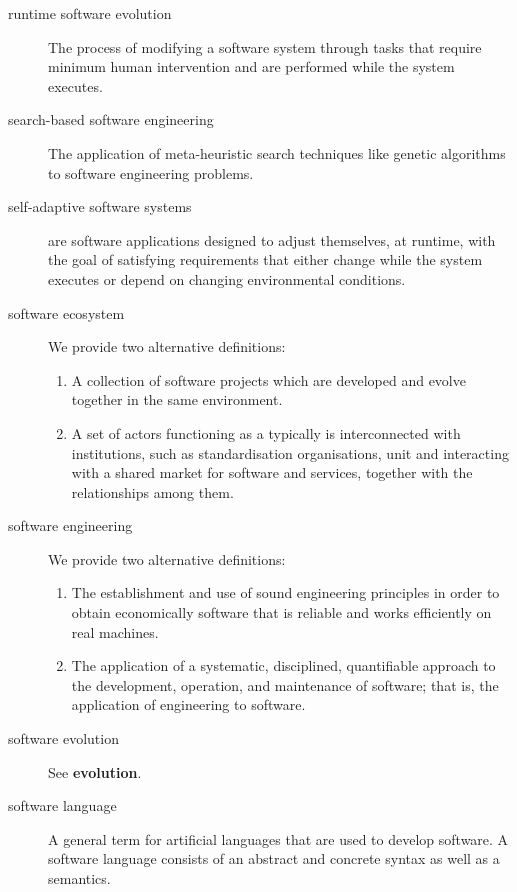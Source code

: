 \documentclass[11pt, oneside]{article}
\begin{document}
\begin{description}
\item[runtime software evolution]
The process of modifying a software system through tasks that require minimum human intervention and are performed while the system executes.


\item[search-based software engineering]
The application of meta-heuristic search techniques like genetic algorithms to software engineering problems.

\item[self-adaptive software systems] are software applications designed to adjust themselves, at runtime, with the goal of satisfying requirements that either change while the system executes or depend on changing environmental conditions.

\item[software ecosystem]
We provide two alternative definitions:
\begin{enumerate}
\item A collection of software projects which are developed and evolve together in the same environment.~\cite{Lungu2009}
\item A set of actors functioning as a typically is interconnected with institutions, such as standardisation organisations,
unit and interacting with a shared market for software and services, together with the relationships among them. \cite{Jansen2009, Jansen2009-ICSE}
\end{enumerate}

\item[software engineering]
 We provide two alternative definitions:
\begin{enumerate}
\item The establishment and use of sound engineering principles in order to obtain economically software that is reliable and works efficiently on real machines. \cite{Naur&al1969}
\item The application of a systematic, disciplined, quantifiable approach to the development, operation, and maintenance of software; that is, the application of engineering to software. \cite{IEEE1999-610-12}
\end{enumerate}

\item[software evolution] See \textbf{evolution}.

\item[software language]
A general term for artificial languages that are used to develop software. A software language consists of an abstract and concrete syntax as well as a semantics.


\end{description}
\end{document}
